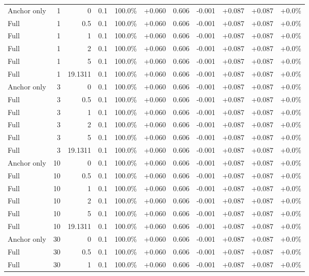\begin{table}[htbp]
\begin{tabular}{lrrrccccccc}
Anchor only & 1 & 0 & 0.1 & 100.0\% & +0.060 & 0.606 & -0.001 & +0.087 & +0.087 & +0.0\% \\
Full & 1 & 0.5 & 0.1 & 100.0\% & +0.060 & 0.606 & -0.001 & +0.087 & +0.087 & +0.0\% \\
Full & 1 & 1 & 0.1 & 100.0\% & +0.060 & 0.606 & -0.001 & +0.087 & +0.087 & +0.0\% \\
Full & 1 & 2 & 0.1 & 100.0\% & +0.060 & 0.606 & -0.001 & +0.087 & +0.087 & +0.0\% \\
Full & 1 & 5 & 0.1 & 100.0\% & +0.060 & 0.606 & -0.001 & +0.087 & +0.087 & +0.0\% \\
Full & 1 & 19.1311 & 0.1 & 100.0\% & +0.060 & 0.606 & -0.001 & +0.087 & +0.087 & +0.0\% \\
Anchor only & 3 & 0 & 0.1 & 100.0\% & +0.060 & 0.606 & -0.001 & +0.087 & +0.087 & +0.0\% \\
Full & 3 & 0.5 & 0.1 & 100.0\% & +0.060 & 0.606 & -0.001 & +0.087 & +0.087 & +0.0\% \\
Full & 3 & 1 & 0.1 & 100.0\% & +0.060 & 0.606 & -0.001 & +0.087 & +0.087 & +0.0\% \\
Full & 3 & 2 & 0.1 & 100.0\% & +0.060 & 0.606 & -0.001 & +0.087 & +0.087 & +0.0\% \\
Full & 3 & 5 & 0.1 & 100.0\% & +0.060 & 0.606 & -0.001 & +0.087 & +0.087 & +0.0\% \\
Full & 3 & 19.1311 & 0.1 & 100.0\% & +0.060 & 0.606 & -0.001 & +0.087 & +0.087 & +0.0\% \\
Anchor only & 10 & 0 & 0.1 & 100.0\% & +0.060 & 0.606 & -0.001 & +0.087 & +0.087 & +0.0\% \\
Full & 10 & 0.5 & 0.1 & 100.0\% & +0.060 & 0.606 & -0.001 & +0.087 & +0.087 & +0.0\% \\
Full & 10 & 1 & 0.1 & 100.0\% & +0.060 & 0.606 & -0.001 & +0.087 & +0.087 & +0.0\% \\
Full & 10 & 2 & 0.1 & 100.0\% & +0.060 & 0.606 & -0.001 & +0.087 & +0.087 & +0.0\% \\
Full & 10 & 5 & 0.1 & 100.0\% & +0.060 & 0.606 & -0.001 & +0.087 & +0.087 & +0.0\% \\
Full & 10 & 19.1311 & 0.1 & 100.0\% & +0.060 & 0.606 & -0.001 & +0.087 & +0.087 & +0.0\% \\
Anchor only & 30 & 0 & 0.1 & 100.0\% & +0.060 & 0.606 & -0.001 & +0.087 & +0.087 & +0.0\% \\
Full & 30 & 0.5 & 0.1 & 100.0\% & +0.060 & 0.606 & -0.001 & +0.087 & +0.087 & +0.0\% \\
Full & 30 & 1 & 0.1 & 100.0\% & +0.060 & 0.606 & -0.001 & +0.087 & +0.087 & +0.0\% \\

\end{tabular}
\end{table}
